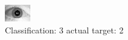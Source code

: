 \begin{figure}[h!]
\begin{center}
\includegraphics[width=0.60\columnwidth]{figures/ID1618_class_3_target_2.png}
\end{center}
\caption{ Classification: 3 actual target: 2}
\label{fig:ID1618_class_3_target_2}
\end{figure}
